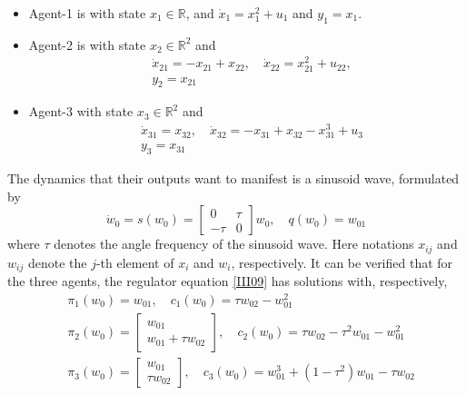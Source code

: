 \documentclass[onecolumn,a4paper,12pt]{article}
\newcommand{\real}{\mathbb{R}}
\numberwithin{equation}{section}
\begin{document}
\begin{itemize}
\item Agent-1 is with state $x_1\in\real$, and $\dot{x}_1=x_1^2+u_1$ and $y_1=x_1$.
\item Agent-2 is with state $x_2\in\real^2$ and
\begin{equation}
\begin{split}
  &\dot{x}_{21}= -x_{21}+x_{22}, \quad \dot{x}_{22}=x_{21}^2+u_{22},\\
  &y_{2}=x_{21}
\end{split}
\end{equation}
\item Agent-3 with state $x_3\in\real^2$ and
\begin{equation}
  \begin{split}
    &\dot{x}_{31}=x_{32},\quad  \dot{x}_{32}=-x_{31}+x_{32} - x_{31}^3+u_3 \\
   & y_3 = x_{31}
  \end{split}
\end{equation}
\end{itemize}
The dynamics that their outputs want to manifest is a sinusoid wave, formulated by
\begin{equation}
  \dot{w}_0=s(w_0)=\begin{bmatrix}
    0 & \tau\\
    -\tau & 0
  \end{bmatrix}w_0, \quad q(w_0)=w_{01}
\end{equation}
where $\tau$ denotes the angle frequency of the sinusoid wave. Here notations $x_{ij}$ and $w_{ij}$ denote the $j$-th element of $x_i$ and $w_i$, respectively. It can be verified that for the three agents, the regulator equation \eqref{III09} has solutions with, respectively,
\begin{subequations}
\begin{align}
  &\pi_1(w_0)=w_{01}, \quad c_1(w_0)=\tau w_{02}-w_{01}^2\\
  &\pi_2(w_0)=\begin{bmatrix}
    w_{01}\\
    w_{01}+\tau w_{02}
  \end{bmatrix}, \quad c_2(w_0)=\tau w_{02}-\tau^2w_{01}-w_{01}^2\\
  &\pi_3(w_0)=\begin{bmatrix}
    w_{01} \\ \tau w_{02}
  \end{bmatrix}, \quad c_3(w_0)=w_{01}^3+(1-\tau^2)w_{01}-\tau w_{02}
\end{align}
\end{subequations}
\end{document}
